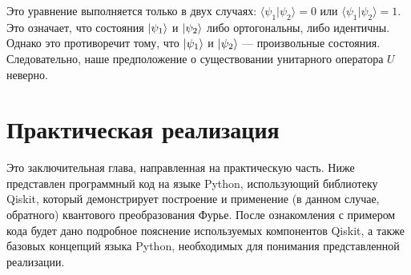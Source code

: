 \documentclass[12pt,a4paper]{article}
\begin{document}
		Это уравнение выполняется только в двух случаях: $\langle \psi_1 | \psi_2 \rangle = 0$ или $\langle \psi_1 | \psi_2 \rangle = 1$. Это означает, что состояния $\ket{\psi_1}$ и $\ket{\psi_2}$ либо ортогональны, либо идентичны. Однако это противоречит тому, что $\ket{\psi_1}$ и $\ket{\psi_2}$ — произвольные состояния. Следовательно, наше предположение о существовании унитарного оператора $U$ неверно.
		
		
		\section{Практическая реализация}
		Это заключительная глава, направленная на практическую часть. Ниже представлен программный код на языке Python, использующий библиотеку Qiskit, который демонстрирует построение и применение (в данном случае, обратного) квантового преобразования Фурье. После ознакомления с примером кода будет дано подробное пояснение используемых компонентов Qiskit, а также базовых концепций языка Python, необходимых для понимания представленной реализации.
	
\end{document}
